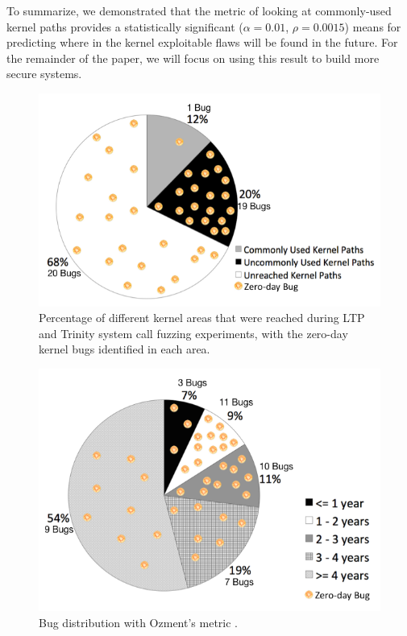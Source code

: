 To summarize, we demonstrated that the metric of looking at commonly-used
kernel paths provides a statistically significant ($\alpha=0.01$,
$\rho=0.0015$) means for predicting where in the kernel exploitable flaws
will be found in the future.  For the remainder of the paper, we will
focus on using this result to build more secure systems.

\begin{figure}
\centering
\includegraphics[width=1.0\columnwidth]{diagram/kernel_coverage.png}
\caption{\small Percentage of different kernel areas that were reached during
 LTP and Trinity system call fuzzing experiments, with the zero-day kernel bugs identified
 in each area.}
\label{fig:coverage}
\end{figure}

\begin{figure}
\centering
\includegraphics[width=1.0\columnwidth]{diagram/metrics_age.png}
\caption{\small Bug distribution with Ozment's metric \cite{ozment2006milk}.}
\label{fig:metrics_age}
\end{figure}

